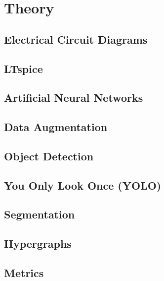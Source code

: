\chapter{Theory}

\section{Electrical Circuit Diagrams}


\section{LTspice}


\section{Artificial Neural Networks}


\section{Data Augmentation}


\section{Object Detection}


\section{You Only Look Once (YOLO)}


\section{Segmentation}


% 


\section{Hypergraphs}

\section{Metrics}

